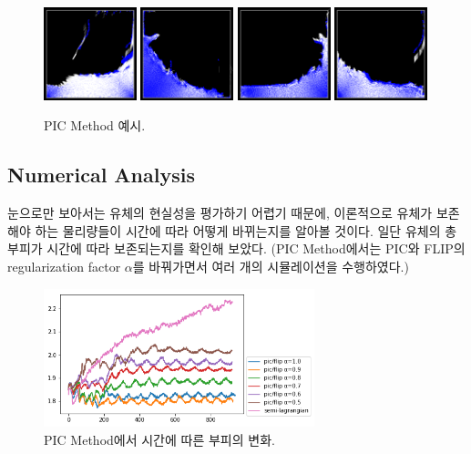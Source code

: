 \documentclass[11pt, A4]{article}
\begin{document}
\begin{figure}[h]
\includegraphics[width=0.24\textwidth]{realism-pic-1}
\includegraphics[width=0.24\textwidth]{realism-pic-2}
\includegraphics[width=0.24\textwidth]{realism-pic-3}
\includegraphics[width=0.24\textwidth]{realism-pic-4}
  \caption{PIC Method 예시.}
  \label{realism-pic}
\end{figure}

\subsection{Numerical Analysis}

눈으로만 보아서는 유체의 현실성을 평가하기 어렵기 때문에, 이론적으로 유체가 보존해야 하는 물리량들이 시간에 따라 어떻게 바뀌는지를 알아볼 것이다. 일단 유체의 총 부피가 시간에 따라 보존되는지를 확인해 보았다. (PIC Method에서는 PIC와 FLIP의 regularization factor $\alpha$를 바꿔가면서 여러 개의 시뮬레이션을 수행하였다.)

\begin{figure}[h]
  \centering
  \includegraphics[width=0.7\textwidth]{picflip-volume-graph}
  \caption{PIC Method에서 시간에 따른 부피의 변화.}
  \label{volume-increase-graph}
\end{figure}
\end{document}

